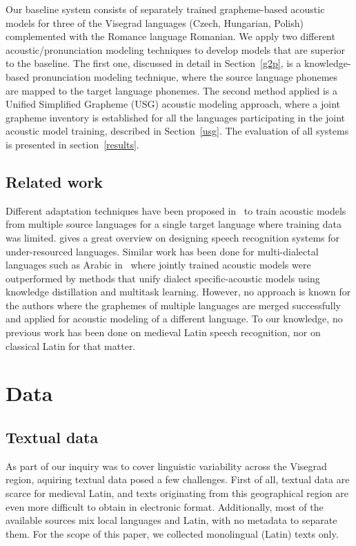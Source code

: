 \documentclass[runningheads,a4paper]{llncs}
\begin{document}
Our baseline system consists of separately trained grapheme-based acoustic models for three of the Visegrad languages (Czech, Hungarian, Polish) complemented with the Romance language Romanian.
We apply two different acoustic/pronunciation modeling techniques to develop models that are superior to the baseline.
The first one, discussed in detail in Section~\ref{g2p}, is a knowledge-based pronunciation modeling technique, where the source language phonemes are mapped to the target language phonemes.
The second method applied is a Unified Simplified Grapheme (USG) acoustic modeling approach, where a joint grapheme inventory is established for all the languages participating in the joint acoustic model training, described in Section~\ref{usg}.
The evaluation of all systems is presented in section~\ref{results}.

\subsection{Related work}
Different adaptation techniques have been proposed in~\cite{schultz01} to train acoustic models from multiple source languages for a single target language where training data was limited.
\cite{besacier14} gives a great overview on designing speech recognition systems for under-resourced languages.
Similar work has been done for multi-dialectal languages such as Arabic in~\cite{elfeky16} where jointly trained acoustic models were outperformed by methods that unify dialect specific-acoustic models using knowledge distillation and multitask learning.
However, no approach is known for the authors where the graphemes of multiple languages are merged successfully and applied for acoustic modeling of a different language.
To our knowledge, no previous work has been done on medieval Latin speech recognition, nor on classical Latin for that matter.

\section{Data}
\subsection{Textual data}\label{text}
As part of our inquiry was to cover linguistic variability across the Visegrad region, aquiring textual data posed a few challenges.
First of all, textual data are scarce for medieval Latin, and texts originating from this geographical region are even more difficult to obtain in electronic format.
Additionally, most of the available sources mix local languages and Latin, with no metadata to separate them.
For the scope of this paper, we collected monolingual (Latin) texts only.
\end{document}

